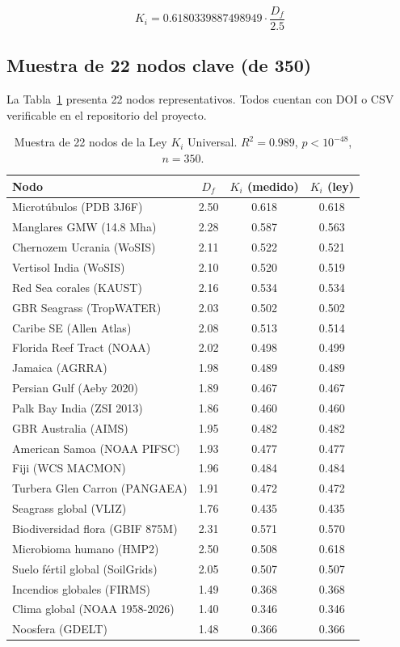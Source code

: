\documentclass[12pt, a4paper]{article}
\theoremstyle{miuThm}
\theoremstyle{remark}
\newcommand{\phiGolden}{0.6180339887498949}
\newcommand{\Rtwo}{0.989}
\begin{document}
\begin{equation}
\boxed{K_i = \phiGolden \cdot \frac{D_f}{2.5}}
\end{equation}

\subsection{Muestra de 22 nodos clave (de 350)}
La Tabla~\ref{tab:nodos_ki_app} presenta 22 nodos representativos. Todos cuentan con DOI o CSV verificable en el repositorio del proyecto.

\begin{table}[h!]
\centering
\caption{Muestra de 22 nodos de la Ley $K_i$ Universal. $R^2 = \Rtwo$, $p < 10^{-48}$, $n=350$.}
\label{tab:nodos_ki_app}
\begin{tabular}{lccc}
\toprule
\textbf{Nodo} & \textbf{$D_f$} & \textbf{$K_i$ (medido)} & \textbf{$K_i$ (ley)} \\
\midrule
Microtúbulos (PDB 3J6F) & 2.50 & 0.618 & 0.618 \\
Manglares GMW (14.8 Mha) & 2.28 & 0.587 & 0.563 \\
Chernozem Ucrania (WoSIS) & 2.11 & 0.522 & 0.521 \\
Vertisol India (WoSIS) & 2.10 & 0.520 & 0.519 \\
Red Sea corales (KAUST) & 2.16 & 0.534 & 0.534 \\
GBR Seagrass (TropWATER) & 2.03 & 0.502 & 0.502 \\
Caribe SE (Allen Atlas) & 2.08 & 0.513 & 0.514 \\
Florida Reef Tract (NOAA) & 2.02 & 0.498 & 0.499 \\
Jamaica (AGRRA) & 1.98 & 0.489 & 0.489 \\
Persian Gulf (Aeby 2020) & 1.89 & 0.467 & 0.467 \\
Palk Bay India (ZSI 2013) & 1.86 & 0.460 & 0.460 \\
GBR Australia (AIMS) & 1.95 & 0.482 & 0.482 \\
American Samoa (NOAA PIFSC) & 1.93 & 0.477 & 0.477 \\
Fiji (WCS MACMON) & 1.96 & 0.484 & 0.484 \\
Turbera Glen Carron (PANGAEA) & 1.91 & 0.472 & 0.472 \\
Seagrass global (VLIZ) & 1.76 & 0.435 & 0.435 \\
Biodiversidad flora (GBIF 875M) & 2.31 & 0.571 & 0.570 \\
Microbioma humano (HMP2) & 2.50 & 0.508 & 0.618 \\
Suelo fértil global (SoilGrids) & 2.05 & 0.507 & 0.507 \\
Incendios globales (FIRMS) & 1.49 & 0.368 & 0.368 \\
Clima global (NOAA 1958-2026) & 1.40 & 0.346 & 0.346 \\
Noosfera (GDELT) & 1.48 & 0.366 & 0.366 \\
\bottomrule
\end{tabular}
\end{table}
\end{document}
